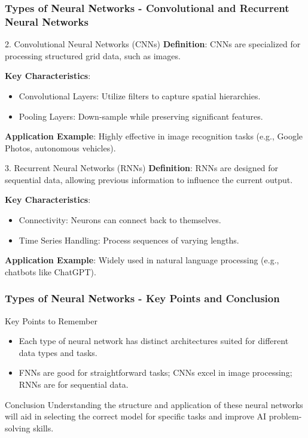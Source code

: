 \documentclass[aspectratio=169]{beamer}
\begin{document}
\begin{frame}[fragile]
    \frametitle{Types of Neural Networks - Convolutional and Recurrent Neural Networks}
    \begin{block}{2. Convolutional Neural Networks (CNNs)}
        \textbf{Definition}:
        CNNs are specialized for processing structured grid data, such as images.

        \textbf{Key Characteristics}:
        \begin{itemize}
            \item Convolutional Layers: Utilize filters to capture spatial hierarchies.
            \item Pooling Layers: Down-sample while preserving significant features.
        \end{itemize}

        \textbf{Application Example}:
        Highly effective in image recognition tasks (e.g., Google Photos, autonomous vehicles).
    \end{block}
    \begin{block}{3. Recurrent Neural Networks (RNNs)}
        \textbf{Definition}:
        RNNs are designed for sequential data, allowing previous information to influence the current output.

        \textbf{Key Characteristics}:
        \begin{itemize}
            \item Connectivity: Neurons can connect back to themselves.
            \item Time Series Handling: Process sequences of varying lengths.
        \end{itemize}

        \textbf{Application Example}:
        Widely used in natural language processing (e.g., chatbots like ChatGPT).
    \end{block}
\end{frame}

\begin{frame}[fragile]
    \frametitle{Types of Neural Networks - Key Points and Conclusion}
    \begin{block}{Key Points to Remember}
        \begin{itemize}
            \item Each type of neural network has distinct architectures suited for different data types and tasks.
            \item FNNs are good for straightforward tasks; CNNs excel in image processing; RNNs are for sequential data.
        \end{itemize}
    \end{block}
    
    \begin{block}{Conclusion}
        Understanding the structure and application of these neural networks will aid in selecting the correct model for specific tasks and improve AI problem-solving skills.
    \end{block}
\end{frame}
\end{document}
